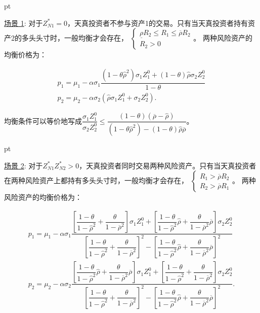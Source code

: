 \documentclass[10.0pt]{article}
\begin{document}
 pt



\underline{场景 1}: 对于$ Z_{N 1}^* = 0$，天真投资者不参与资产1的交易。只有当天真投资者持有资产2的多头头寸时，一般均衡才会存在， $ \left\{ \begin{matrix} \underline{\rho} R_2 \leqslant R_1 \leqslant \overline{\rho} R_2 \\ R_2 > 0 \end{matrix} \right. $。 两种风险资产的均衡价格为：

\begin{eqnarray}
& p_1 = \mu_1 - \alpha \sigma_1 \dfrac{(1 - \theta {\hat \rho}^2) \sigma_1 Z_1^0 + (1 - \theta) {\hat \rho} \sigma_2 Z_2^0}{1 - \theta} & \\
& p_2 = \mu_2 - \alpha \sigma_2 ({\hat \rho} \sigma_1 Z_1^0 + \sigma_2 Z_2^0). &
\end{eqnarray}

均衡条件可以等价地写成$ \dfrac{\sigma_1 Z_1^0}{\sigma_2 Z_2^0} \leqslant \dfrac{(1 - \theta) (\overline{\rho} - {\hat \rho})}{(1 - \theta {\hat \rho}^2) - (1 - \theta) {\hat \rho} \overline{\rho}} $。

 pt



\underline{场景 2}: 对于$ Z_{N 1}^* Z_{N 2}^* > 0$，天真投资者同时交易两种风险资产。只有当天真投资者在两种风险资产上都持有多头头寸时，一般均衡才会存在， $ \left\{ \begin{matrix} R_1 > \overline{\rho} R_2 \\ R_2 > \overline{\rho} R_1 \end{matrix} \right. $。 两种风险资产的均衡价格为：


\begin{eqnarray}
& p_1 = \mu_1 - \alpha \sigma_1 \dfrac{\left[ \dfrac{1 - \theta}{1 - {\hat \rho}^2} + \dfrac{\theta}{1 - \overline{\rho}^2} \right] \sigma_1 Z_1^0 + \left[ \dfrac{1 - \theta}{1 - {\hat \rho}^2} {\hat \rho} + \dfrac{\theta}{1 - \overline{\rho}^2} \overline{\rho} \right] \sigma_2 Z_2^0}{\left[ \dfrac{1 - \theta}{1 - {\hat \rho}^2} + \dfrac{\theta}{1 - \overline{\rho}^2} \right]^2 - \left[ \dfrac{1 - \theta}{1 - {\hat \rho}^2} {\hat \rho} + \dfrac{\theta}{1 - \overline{\rho}^2} \overline{\rho} \right]^2} & \\
& p_2 = \mu_2 - \alpha \sigma_2 \dfrac{\left[ \dfrac{1 - \theta}{1 - {\hat \rho}^2} {\hat \rho} + \dfrac{\theta}{1 - \overline{\rho}^2} \overline{\rho} \right] \sigma_1 Z_1^0 + \left[ \dfrac{1 - \theta}{1 - {\hat \rho}^2} + \dfrac{\theta}{1 - \overline{\rho}^2} \right] \sigma_2 Z_2^0}{\left[ \dfrac{1 - \theta}{1 - {\hat \rho}^2} + \dfrac{\theta}{1 - \overline{\rho}^2} \right]^2 - \left[ \dfrac{1 - \theta}{1 - {\hat \rho}^2} {\hat \rho} + \dfrac{\theta}{1 - \overline{\rho}^2} \overline{\rho} \right]^2}. &
\end{eqnarray}
\end{document}
